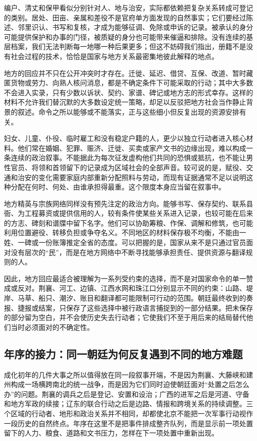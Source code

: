 编户、清丈和保甲看似分别针对人、地与治安，实际都依赖把复杂关系转成可登记的类别。居处、田亩、亲属和差役不是官府单方面发现的自然事实；它们要经过陈述、邻里识认、书写和复核，才成为能够征调、免除或申诉的记录。被承认的身分可能提供保护和办事的门径，被质疑的身分也可能带来催逼和排除。没有连续的基层档案，我们无法判断每一地哪一种后果更多；但这不妨碍我们指出，册籍不是没有社会过程的技术，恰恰是国家与地方关系最密集地彼此解释的地点。

地方的回应并不只在公开冲突时才存在。迁徙、延迟、借贷、互保、改道、暂时藏匿货物或劳力、向熟人核问消息，都是不确定条件下可能采取的行动；其中大多数不会进入实录，只有少数以诉状、契约、家谱、碑记或地方志的形式幸存。这样的材料不允许我们替沉默的大多数设定统一策略，却足以反驳把地方社会当作静止背景的叙述。命令之所以能够或不能落实，正与这些细小但反复出现的资源安排有关。

妇女、儿童、仆役、临时雇工和没有稳定户籍的人，更少以独立行动者进入核心材料。他们常在婚姻、犯罪、赈济、迁徙、买卖或家产文书的边缘出现，难以构成一条连续的政治叙事。不能据此为每次征发虚构他们共同的恐惧或抵抗，也不能让男性官员、将领和首领留下的记录成为区域社会的全部声音。较可说的是，赋役、交通和治安的变化需要家庭内部重新分配照料与劳动，而现有证据通常不足以说明这种分配在何时、何处、由谁承担得最重。这个限度本身应当留在叙事中。

地方精英与宗族网络同样没有预先注定的政治方向。能够书写、保存契约、联系县衙、为工程募资或提供信用的人，较有条件使某些关系进入记录，也较可能在后来的方志、碑刻和谱牒中留下名字。他们可以协助筹粮、作保、调解和修筑，也可能利用位置避役、转移负担或争夺名义。不同地区的材料保存极不均衡，不能由一姓、一碑或一份账簿推定全省的态度。可以把握的是，国家从来不是只通过官员面对没有层次的“民”，而是在地方网络中不断寻找能够承担责任、提供资源与翻译规则的人。

因此，地方回应最适合被理解为一系列受约束的选择，而不是对国家命令的单一赞成或反对。荆襄、河工、边镇、江西水网和珠江口分别显示不同的约束：山路、堤岸、马草、船只、潮汐、账目和翻译都可能限制可行动的范围。朝廷最终收到的奏报、捷报或结案，只保存了这些选择中被行政语言捕捉到的一部分结果。把未保存的部分留为空白，并不会使历史失去行动者；它使我们不至于用后来的结局替代他们当时必须面对的不确定性。

\subsection{年序的接力：同一朝廷为何反复遇到不同的地方难题}

成化初年的几件大事之所以值得放在同一段叙事开端，不是因为荆襄、大藤峡和建州构成一场横跨南北的统一战争，而是因为它们同时迫使朝廷面对“处置之后怎么办”的问题。荆襄的调兵之后是登记、安置和设治；广西的进军之后是河道、守备和地方军政的续接；辽东的联合行动之后是边路、情报和跨境关系的持续调整。三个区域的行动者、地形和政治关系并不相同，却都使北京不能把一次军事行动视作一段历史的自然终点。年序在这里不是把事件排成整齐队列，而是显示前一项处置留下的人力、粮食、道路和文书压力，怎样在下一项处置中重新出现。

